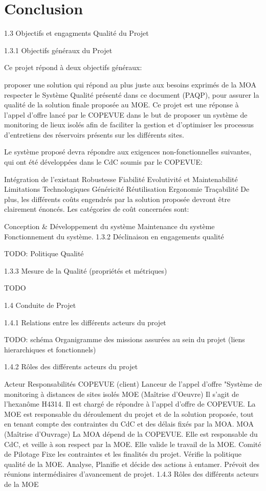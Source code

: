\section{Conclusion}



1.3   Objectifs et engagments Qualité du Projet

1.3.1   Objectifs généraux du Projet

Ce projet répond à deux objectifs généraux:

proposer une solution qui répond au plus juste aux besoins exprimés de la MOA
respecter le Système Qualité présenté dans ce document (PAQP), pour assurer la qualité de la solution finale proposée au MOE.
Ce projet est une réponse à l'appel d'offre lancé par le COPEVUE dans le but de proposer un système de monitoring de lieux isolés afin de faciliter la gestion et d'optimiser les processus d'entretiens des réservoirs présents sur les différents sites.

Le système proposé devra répondre aux exigences non-fonctionnelles suivantes, qui ont été développées dans le CdC soumis par le COPEVUE:

Intégration de l'existant
Robustesse
Fiabilité
Evolutivité et Maintenabilité
Limitations Technologiques
Généricité
Réutilisation
Ergonomie
Traçabilité
De plus, les différents coûts engendrés par la solution proposée devront être clairement énoncés. Les catégories de coût concernées sont:

Conception \& Développement du système
Maintenance du système
Fonctionnement du système.
1.3.2   Déclinaison en engagements qualité

TODO: Politique Qualité

1.3.3   Mesure de la Qualité (propriétés et métriques)

TODO

1.4   Conduite de Projet

1.4.1   Relations entre les différents acteurs du projet

TODO: schéma Organigramme des missions assurées au sein du projet (liens hierarchiques et fonctionnels)

1.4.2   Rôles des différents acteurs du projet

Acteur	Responsabilités
COPEVUE (client)	Lanceur de l'appel d'offre "Système de monitoring à distances de sites isolés
MOE (Maîtrise d'Oeuvre)	Il s'agit de l'hexanôme H4314. Il est chargé de répondre à l'appel d'offre de COPEVUE. La MOE est responsable du déroulement du projet et de la solution proposée, tout en tenant compte des contraintes du CdC et des délais fixés par la MOA.
MOA (Maîtrise d'Ouvrage)	La MOA dépend de la COPEVUE. Elle est responsable du CdC, et veille à son respect par la MOE. Elle valide le travail de la MOE.
Comité de Pilotage	Fixe les contraintes et les finalités du projet. Vérifie la politique qualité de la MOE. Analyse, Planifie et décide des actions à entamer. Prévoit des réunions intermédiaires d'avancement de projet.
1.4.3   Rôles des différents acteurs de la MOE

